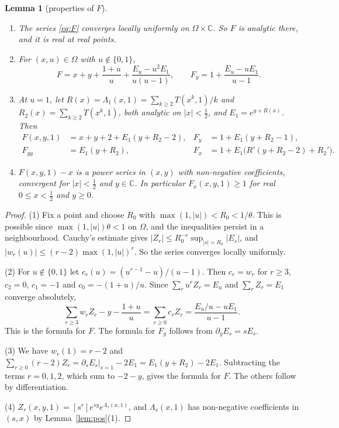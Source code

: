 \documentclass[11pt]{amsart}
\newtheorem{lemma}[theorem]{Lemma}
\theoremstyle{definition}
\theoremstyle{remark}
\numberwithin{equation}{section}
\newcommand{\CC}{\mathbb{C}}
\newcommand{\abs}[1]{\lvert #1\rvert}
\begin{document}
\begin{lemma}[properties of \(F\)]\label{lem:F}
\begin{enumerate}
\item The series \eqref{eq:F} converges locally uniformly on \(\Omega\times\CC\). So \(F\) is analytic there, and it is real at real points.
\item For \((x,u)\in\Omega\) with \(u\notin\{0,1\}\),
\begin{equation}\label{eq:Fclosed}
F=x+y+\frac{1+u}{u}+\frac{E_u-u^2E_1}{u(u-1)},\qquad F_y=1+\frac{E_u-uE_1}{u-1}.
\end{equation}
\item At \(u=1\), let \(R(x)=\Lambda_1(x,1)=\sum_{k\ge2}T(x^k,1)/k\) and \(R_2(x)=\sum_{k\ge2}T(x^k,1)\), both analytic on \(\abs{x}<\frac12\), and \(E_1=e^{y+R(x)}\). Then
\begin{equation}\label{eq:Fu1}
\begin{aligned}
F(x,y,1)&=x+y+2+E_1(y+R_2-2), & F_y&=1+E_1(y+R_2-1),\\
F_{yy}&=E_1(y+R_2), & F_x&=1+E_1\bigl(R'(y+R_2-2)+R_2'\bigr).
\end{aligned}
\end{equation}
\item \(F(x,y,1)-x\) is a power series in \((x,y)\) with non-negative coefficients, convergent for \(\abs{x}<\frac12\) and \(y\in\CC\). In particular \(F_x(x,y,1)\ge1\) for real \(0\le x<\frac12\) and \(y\ge0\).
\end{enumerate}
\end{lemma}

\begin{proof}
(1) Fix a point and choose \(R_0\) with \(\max(1,\abs{u})<R_0<1/\theta\). This is possible since \(\max(1,\abs{u})\theta<1\) on \(\Omega\), and the inequalities persist in a neighbourhood. Cauchy's estimate gives \(\abs{Z_r}\le R_0^{-r}\sup_{\abs{s}=R_0}\abs{E_s}\), and \(\abs{w_r(u)}\le(r-2)\max(1,\abs{u})^{r}\). So the series converges locally uniformly.

(2) For \(u\notin\{0,1\}\) let \(c_r(u)=(u^{r-1}-u)/(u-1)\). Then \(c_r=w_r\) for \(r\ge3\), \(c_2=0\), \(c_1=-1\) and \(c_0=-(1+u)/u\). Since \(\sum_ru^rZ_r=E_u\) and \(\sum_rZ_r=E_1\) converge absolutely,
\[
\sum_{r\ge3}w_rZ_r-y-\frac{1+u}{u}=\sum_{r\ge0}c_rZ_r=\frac{E_u/u-uE_1}{u-1}.
\]
This is the formula for \(F\). The formula for \(F_y\) follows from \(\partial_yE_s=sE_s\).

(3) We have \(w_r(1)=r-2\) and \(\sum_{r\ge0}(r-2)Z_r=\partial_sE_s|_{s=1}-2E_1=E_1(y+R_2)-2E_1\). Subtracting the terms \(r=0,1,2\), which sum to \(-2-y\), gives the formula for \(F\). The others follow by differentiation.

(4) \(Z_r(x,y,1)=[s^r]e^{sy}e^{\Lambda_s(x,1)}\), and \(\Lambda_s(x,1)\) has non-negative coefficients in \((s,x)\) by Lemma~\ref{lem:pos}(1).
\end{proof}
\end{document}
